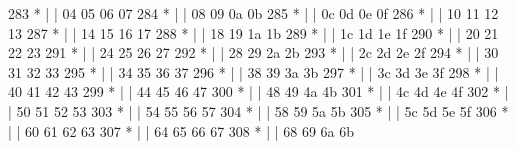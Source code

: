 \begin{DoxyCode}
283 \textcolor{comment}{         * |    |                                            04  05  06  07}
284 \textcolor{comment}{         * |    |                                            08  09  0a  0b}
285 \textcolor{comment}{         * |    |                                            0c  0d  0e  0f}
286 \textcolor{comment}{         * |    |                                            10  11  12  13}
287 \textcolor{comment}{         * |    |                                            14  15  16  17}
288 \textcolor{comment}{         * |    |                                            18  19  1a  1b}
289 \textcolor{comment}{         * |    |                                            1c  1d  1e  1f}
290 \textcolor{comment}{         * |    |                                            20  21  22  23}
291 \textcolor{comment}{         * |    |                                            24  25  26  27}
292 \textcolor{comment}{         * |    |                                            28  29  2a  2b}
293 \textcolor{comment}{         * |    |                                            2c  2d  2e  2f}
294 \textcolor{comment}{         * |    |                                            30  31  32  33}
295 \textcolor{comment}{         * |    |                                            34  35  36  37}
296 \textcolor{comment}{         * |    |                                            38  39  3a  3b}
297 \textcolor{comment}{         * |    |                                            3c  3d  3e  3f}
298 \textcolor{comment}{         * |    |                                            40  41  42  43}
299 \textcolor{comment}{         * |    |                                            44  45  46  47}
300 \textcolor{comment}{         * |    |                                            48  49  4a  4b}
301 \textcolor{comment}{         * |    |                                            4c  4d  4e  4f}
302 \textcolor{comment}{         * |    |                                            50  51  52  53}
303 \textcolor{comment}{         * |    |                                            54  55  56  57}
304 \textcolor{comment}{         * |    |                                            58  59  5a  5b}
305 \textcolor{comment}{         * |    |                                            5c  5d  5e  5f}
306 \textcolor{comment}{         * |    |                                            60  61  62  63}
307 \textcolor{comment}{         * |    |                                            64  65  66  67}
308 \textcolor{comment}{         * |    |                                            68  69  6a  6b}

\end{DoxyCode}
